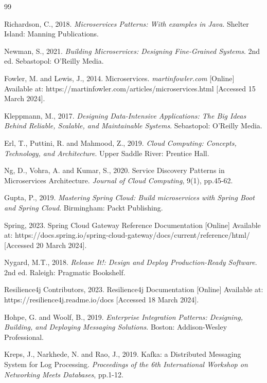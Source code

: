 \cleardoublepage
\pagestyle{fancy}
\fancyhead{}
\fancyfoot[C]{\thepage}

\begin{thebibliography}{99}

Richardson, C., 2018. \textit{Microservices Patterns: With examples in Java}. Shelter Island: Manning Publications.

Newman, S., 2021. \textit{Building Microservices: Designing Fine-Grained Systems}. 2nd ed. Sebastopol: O'Reilly Media.

Fowler, M. and Lewis, J., 2014. Microservices. \textit{martinfowler.com} [Online] Available at: https://martinfowler.com/articles/microservices.html [Accessed 15 March 2024].

Kleppmann, M., 2017. \textit{Designing Data-Intensive Applications: The Big Ideas Behind Reliable, Scalable, and Maintainable Systems}. Sebastopol: O'Reilly Media.

Erl, T., Puttini, R. and Mahmood, Z., 2019. \textit{Cloud Computing: Concepts, Technology, and Architecture}. Upper Saddle River: Prentice Hall.

Ng, D., Vohra, A. and Kumar, S., 2020. Service Discovery Patterns in Microservices Architecture. \textit{Journal of Cloud Computing}, 9(1), pp.45-62.

Gupta, P., 2019. \textit{Mastering Spring Cloud: Build microservices with Spring Boot and Spring Cloud}. Birmingham: Packt Publishing.

Spring, 2023. Spring Cloud Gateway Reference Documentation [Online] Available at: https://docs.spring.io/spring-cloud-gateway/docs/current/reference/html/ [Accessed 20 March 2024].

Nygard, M.T., 2018. \textit{Release It!: Design and Deploy Production-Ready Software}. 2nd ed. Raleigh: Pragmatic Bookshelf.

Resilience4j Contributors, 2023. Resilience4j Documentation [Online] Available at: https://resilience4j.readme.io/docs [Accessed 18 March 2024].

Hohpe, G. and Woolf, B., 2019. \textit{Enterprise Integration Patterns: Designing, Building, and Deploying Messaging Solutions}. Boston: Addison-Wesley Professional.

Kreps, J., Narkhede, N. and Rao, J., 2019. Kafka: a Distributed Messaging System for Log Processing. \textit{Proceedings of the 6th International Workshop on Networking Meets Databases}, pp.1-12.


\end{thebibliography}
